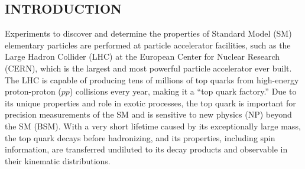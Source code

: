 \begin{refsection}

\chapter*{INTRODUCTION}
\label{Introduction}

Experiments to discover and determine the properties of Standard Model (SM) elementary particles are performed at particle accelerator facilities, such as the Large Hadron Collider (LHC) at the European Center for Nuclear Research (CERN), which is the largest and most powerful particle accelerator ever built.
The LHC is capable of producing tens of millions of top quarks from high-energy proton-proton ($pp$) collisions every year, making it a ``top quark factory.''
Due to its unique properties and role in exotic processes, the top quark is important for precision measurements of the SM and is sensitive to new physics (NP) beyond the SM (BSM).
With a very short lifetime caused by its exceptionally large mass, the top quark decays before hadronizing, and its properties, including spin information, are transferred undiluted to its decay products and observable in their kinematic distributions.


\end{refsection}
